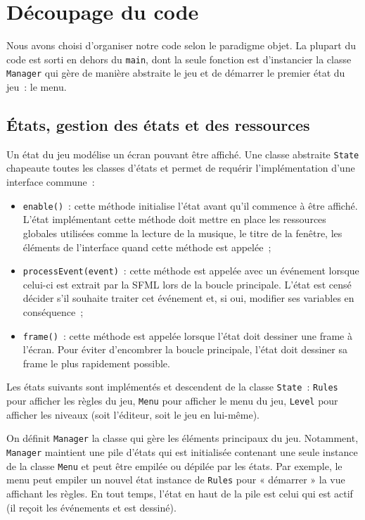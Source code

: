 \section{Découpage du code}

Nous avons choisi d'organiser notre code selon le paradigme objet. La plupart
du code est sorti en dehors du \texttt{main}, dont la seule fonction est d'instancier
la classe \texttt{Manager} qui gère de manière abstraite le jeu et de démarrer
le premier état du jeu~: le menu.

\subsection{États, gestion des états et des ressources}

Un état du jeu modélise un écran pouvant être affiché. Une classe
abstraite \texttt{State} chapeaute toutes les classes d'états et permet
de requérir l'implémentation d'une interface commune~:

\begin{itemize}
    \item \texttt{enable()}~: cette méthode initialise l'état avant qu'il
    commence à être affiché. L'état implémentant cette méthode doit
    mettre en place les ressources globales utilisées comme la lecture
    de la musique, le titre de la fenêtre, les éléments de l'interface
    quand cette méthode est appelée~;

    \item \texttt{processEvent(event)}~: cette méthode est appelée avec
    un événement lorsque celui-ci est extrait par la SFML lors de la boucle
    principale. L'état est censé décider s'il souhaite traiter cet événement
    et, si oui, modifier ses variables en conséquence~;

    \item \texttt{frame()}~: cette méthode est appelée lorsque l'état
    doit dessiner une frame à l'écran. Pour éviter d'encombrer la boucle
    principale, l'état doit dessiner sa frame le plus rapidement possible.
\end{itemize}

Les états suivants sont implémentés et descendent de la classe \texttt{State}~:
\texttt{Rules} pour afficher les règles du jeu, \texttt{Menu} pour afficher
le menu du jeu, \texttt{Level} pour afficher les niveaux (soit l'éditeur,
soit le jeu en lui-même).

On définit \texttt{Manager} la classe qui gère les éléments principaux du jeu.
Notamment, \texttt{Manager} maintient une pile d'états qui est initialisée
contenant une seule instance de la classe \texttt{Menu} et peut être
empilée ou dépilée par les états. Par exemple, le menu peut empiler
un nouvel état instance de \texttt{Rules} pour « démarrer » la vue affichant
les règles. En tout temps, l'état en haut de la pile est celui qui est actif
(il reçoit les événements et est dessiné).

